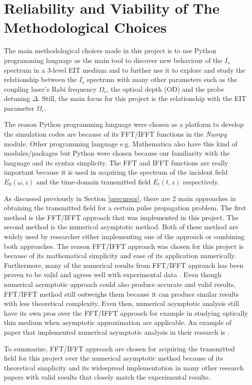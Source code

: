 \section{Reliability and Viability of The Methodological Choices}
The main methodological choices made in this project is to use Python programming language as the main tool to discover new behaviour of the $I_{s}$ spectrum in a 3-level EIT medium and to further use it to explore and study the relationship between the $I_{s}$ spectrum with many other parameters such as the coupling laser's Rabi frequency $\Omega_{c}$, the optical depth (OD) and the probe detuning $\Delta$. Still, the main focus for this project is the relationship with the EIT parameter $\Omega_{c}$.

The reason Python programming language were chosen as a platform to develop the simulation codes are because of its FFT/IFFT functions in the \textit{Numpy} module. Other programming language e.g. Mathematica also have this kind of modules/packages but Python were chosen because our familiarity with the language and its syntax simplicity. The FFT and IFFT functions are really important because it is used in acquiring the spectrum of the incident field $E_{0}(\omega, z)$ and the time-domain transmitted field $E_{t}(t, z)$ respectively.

As discussed previously in Section \ref{precursor}, there are 2 main approaches in obtaining the transmitted field for a certain pulse propagation problem. The first method is the FFT/IFFT approach that was implemented in this project. The second method is the numerical asymptotic method. Both of these method are widely used by researcher either implementing one of the approach or combining both approaches. The reason FFT/IFFT approach was chosen for this project is because of its mathematical simplicity and ease of its application numerically. Furthermore, many of the numerical results from FFT/IFFT approach has been proven to be valid and agrees well with experimental data \cite{Macke2013, Oughstun2010, Jeong2008, jeong2010slow}. Even though numerical asymptotic approach could also produce accurate and valid results, FFT/IFFT method still outweighs them because it can produce similar results with less theoretical complexity. Even then, numerical asymptotic analysis still have its own pros over the FFT/IFFT approach for example in studying optically thin medium when asymptotic approximation are applicable. An example of paper that implemented numerical asymptotic analysis in their research is \cite{Jeong2009}.

To summarize, FFT/IFFT approach are chosen for acquiring the transmitted field for this project over the numerical asymptotic method because of its theoretical simplicity and its widespread implementation in many other research papers with valid results that closely match the experimental results.
